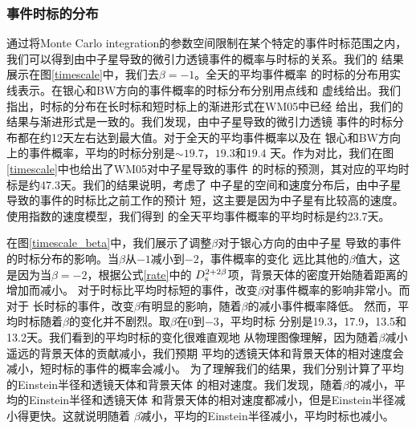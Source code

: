 \subsubsection{事件时标的分布}

通过将Monte Carlo integration的参数空间限制在某个特定的事件时标范围之内，
我们可以得到由中子星导致的微引力透镜事件的概率与时标的关系。我们的
结果展示在图\ref{timescale}中，我们去$\beta=-1$。全天的平均事件概率
的时标的分布用实线表示。在银心和BW方向的事件概率的时标分布分别用点线和
虚线给出。我们指出，时标的分布在长时标和短时标上的渐进形式在WM05中已经
给出，我们的结果与渐进形式是一致的。我们发现，由中子星导致的微引力透镜
事件的时标分布都在约12天左右达到最大值。对于全天的平均事件概率以及在
银心和BW方向上的事件概率，平均的时标分别是$\sim19.7$，$19.3$和$19.4$
天。作为对比，我们在图\ref{timescale}中也给出了WM05对中子星导致的事件
的时标的预测，其对应的平均时标是约47.3天。我们的结果说明，考虑了
中子星的空间和速度分布后，由中子星导致的事件的时标比之前工作的预计
短，这主要是因为中子星有比较高的速度。使用指数的速度模型，我们得到
的全天平均事件概率的平均时标是约23.7天。

在图\ref{timescale_beta}中，我们展示了调整$\beta$对于银心方向的由中子星
导致的事件的时标分布的影响。当$\beta$从$-1$减小到$-2$，事件概率的变化
远比其他的$\beta$值大，这是因为当$\beta=-2$，根据公式\ref{rate}中的
$D_{\rm{s}}^{2+2\beta}$项，背景天体的密度开始随着距离的增加而减小。
对于时标比平均时标短的事件，改变$\beta$对事件概率的影响非常小。而对于
长时标的事件，改变$\beta$有明显的影响，随着$\beta$的减小事件概率降低。
然而，平均时标随着$\beta$的变化并不剧烈。取$\beta$在0到$-3$，平均时标
分别是19.3，17.9，13.5和13.2天。我们看到的平均时标的变化很难直观地
从物理图像理解，因为随着$\beta$减小遥远的背景天体的贡献减小，我们预期
平均的透镜天体和背景天体的相对速度会减小，短时标的事件的概率会减小。
为了理解我们的结果，我们分别计算了平均的Einstein半径和透镜天体和背景天体
的相对速度。我们发现，随着$\beta$的减小，平均的Einstein半径和透镜天体
和背景天体的相对速度都减小，但是Einstein半径减小得更快。这就说明随着
$\beta$减小，平均的Einstein半径减小，平均时标也减小。


